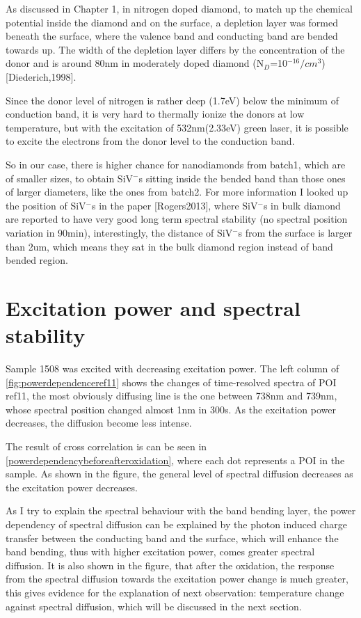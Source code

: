 As discussed in Chapter 1, in nitrogen doped diamond, to match up the chemical potential inside the diamond and on the surface, a depletion layer was formed beneath the surface, where the valence band and conducting band are bended towards up. The width of the depletion layer differs by the concentration of the donor and is around 80nm in moderately doped diamond (N$_{D}$=10$^{-16}/cm^{3}$)[Diederich,1998]. 

Since the donor level of nitrogen is rather deep (1.7eV) below the minimum of conduction band, it is very hard to thermally ionize the donors at low temperature, but with the excitation of 532nm(2.33eV) green laser, it is possible to excite the electrons from the donor level to the conduction band. 

So in our case, there is higher chance for nanodiamonds from batch1, which are of smaller sizes, to obtain SiV$^{-}$s sitting inside the bended band than those ones of larger diameters, like the ones from batch2. For more information I looked up the position of SiV$^{-}$s in the paper [Rogers2013], where SiV$^{-}$s in bulk diamond are reported to have very good long term spectral stability (no spectral position variation in 90min), interestingly, the distance of SiV$^{-}$s from the surface is larger than 2um, which means they sat in the bulk diamond region instead of band bended region. 


\section{Excitation power and spectral stability}

Sample 1508 was excited with decreasing excitation power. The left column of \ref{fig:powerdependenceref11} shows the changes of time-resolved spectra of POI ref11, the most obviously diffusing line is the one between 738nm and 739nm, whose spectral position changed almost 1nm in 300s. As the excitation power decreases, the diffusion become less intense.

The result of cross correlation is can be seen in \ref{powerdependencybeforeafteroxidation}, where each dot represents a POI in the sample. As shown in the figure, the general level of spectral diffusion decreases as the excitation power decreases. 

As I try to explain the spectral behaviour with the band bending layer, the power dependency of spectral diffusion can be explained by the photon induced charge transfer between the conducting band and the surface, which will enhance the band bending, thus with higher excitation power, comes greater spectral diffusion. It is also shown in the figure, that after the oxidation, the response from the spectral diffusion towards the excitation power change is much greater, this gives evidence for the explanation of next observation: temperature change against spectral diffusion, which will be discussed in the next section.  
 
